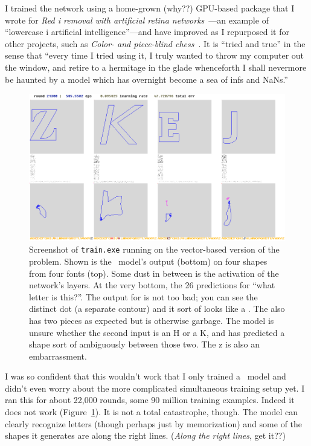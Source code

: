 \documentclass[twocolumn]{amsart}
\begin{document}
\newcommand\nan{\textsf{NaN}}
\renewcommand\inf{\textsf{inf}}

I trained the network using a home-grown (why??) GPU-based package
that I wrote for {\em Red i removal with artificial retina
  networks}~\cite{murphy2015redi}---an example of ``lowercase i
artificial intelligence''---and have improved as I repurposed it for
other projects, such as {\em Color- and piece-blind
  chess}~\cite{murphy2019blind}. It is ``tried and true'' in the
sense that ``every time I tried using it, I truly wanted to throw
my computer out the window, and retire to a hermitage in the glade
whenceforth I shall nevermore be haunted by a model which has
overnight become a sea of \inf{}s and \nan{}s.''

\begin{figure}[ht]
\includegraphics[width=0.9 \linewidth]{trainingvector}
\caption{ Screenshot of {\tt train.exe} running on the vector-based
  version of the problem. Shown is the \makelowercase\ model's output
  (bottom) on four shapes from four fonts (top). Some dust in between
  is the activation of the network's layers. At the very bottom, the
  26 predictions for ``what letter is this?''. The output for
   is not too bad; you can see the distinct dot (a
  separate contour) and it sort of looks like a . The
   also has two pieces as expected but is otherwise
  garbage. The model is unsure whether the second input is an H
  or a K, and has predicted a shape sort of ambiguously between those
  two. The \lowercase{z} is also an embarrassment.
} \label{fig:trainingvector}
\end{figure}

I was so {\tiny confident} that this wouldn't work that I only trained
a \makelowercase\ model and didn't even worry about the more
complicated simultaneous training setup yet. I ran this for about
22,000 rounds, some 90 million training examples. Indeed it does not
work (Figure~\ref{fig:trainingvector}). It is not a total catastrophe,
though. The model can clearly recognize letters (though perhaps just by
memorization) and some of the shapes it generates are along the right
lines. ({\em Along the right lines}, get it??)
\end{document}
